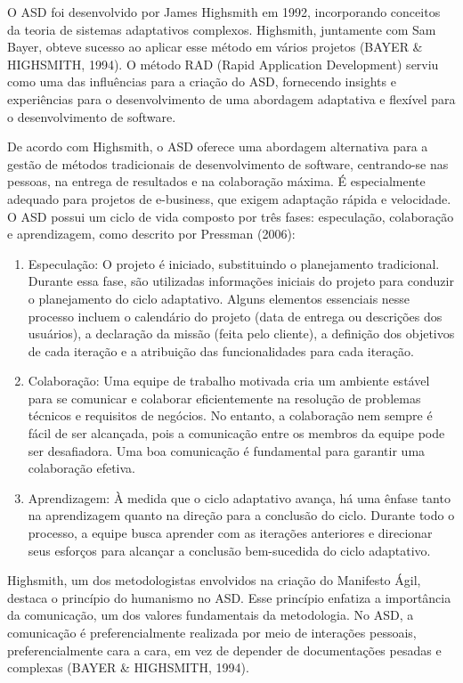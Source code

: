 O ASD foi desenvolvido por James Highsmith em 1992, incorporando conceitos da teoria de sistemas adaptativos complexos. Highsmith, juntamente com Sam Bayer, obteve sucesso ao aplicar esse método em vários projetos (BAYER \& HIGHSMITH, 1994). O método RAD (Rapid Application Development) serviu como uma das influências para a criação do ASD, fornecendo insights e experiências para o desenvolvimento de uma abordagem adaptativa e flexível para o desenvolvimento de software.

De acordo com Highsmith, o ASD oferece uma abordagem alternativa para a gestão de métodos tradicionais de desenvolvimento de software, centrando-se nas pessoas, na entrega de resultados e na colaboração máxima. É especialmente adequado para projetos de e-business, que exigem adaptação rápida e velocidade. O ASD possui um ciclo de vida composto por três fases: especulação, colaboração e aprendizagem, como descrito por Pressman (2006):

\begin{enumerate}
	\item Especulação: O projeto é iniciado, substituindo o planejamento tradicional. Durante essa fase, são utilizadas informações iniciais do projeto para conduzir o planejamento do ciclo adaptativo. Alguns elementos essenciais nesse processo incluem o calendário do projeto (data de entrega ou descrições dos usuários), a declaração da missão (feita pelo cliente), a definição dos objetivos de cada iteração e a atribuição das funcionalidades para cada iteração.
	\item Colaboração: Uma equipe de trabalho motivada cria um ambiente estável para se comunicar e colaborar eficientemente na resolução de problemas técnicos e requisitos de negócios. No entanto, a colaboração nem sempre é fácil de ser alcançada, pois a comunicação entre os membros da equipe pode ser desafiadora. Uma boa comunicação é fundamental para garantir uma colaboração efetiva.
	\item Aprendizagem: À medida que o ciclo adaptativo avança, há uma ênfase tanto na aprendizagem quanto na direção para a conclusão do ciclo. Durante todo o processo, a equipe busca aprender com as iterações anteriores e direcionar seus esforços para alcançar a conclusão bem-sucedida do ciclo adaptativo.
\end{enumerate}

Highsmith, um dos metodologistas envolvidos na criação do Manifesto Ágil, destaca o princípio do humanismo no ASD. Esse princípio enfatiza a importância da comunicação, um dos valores fundamentais da metodologia. No ASD, a comunicação é preferencialmente realizada por meio de interações pessoais, preferencialmente cara a cara, em vez de depender de documentações pesadas e complexas (BAYER \& HIGHSMITH, 1994).

